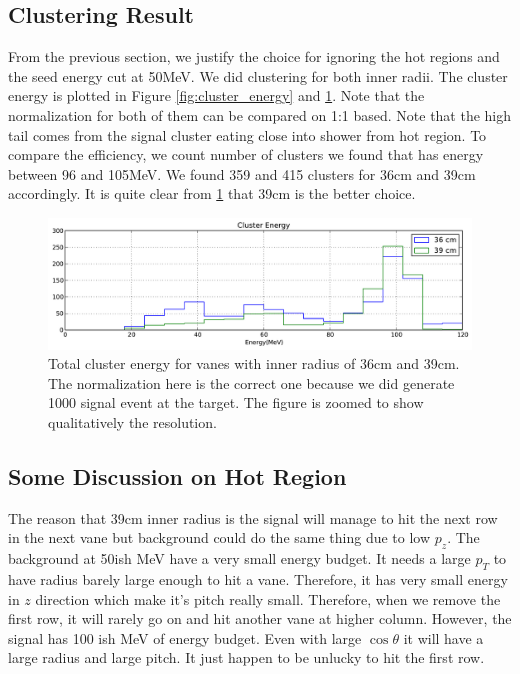 \documentclass[11pt]{article}
\begin{document}
\subsection{Clustering Result}
From the previous section, we justify the choice for ignoring the hot regions and the seed energy cut at 50MeV. We did clustering for both inner radii. The cluster energy is plotted in Figure \ref{fig:cluster_energy} and \ref{fig:cluster_energy_no_zoom}. Note that the normalization for both of them can be compared on 1:1 based. Note that the high tail comes from the signal cluster eating close into shower from hot region. To compare the efficiency, we count number of clusters we found that has energy between 96 and 105MeV. We found 359 and 415 clusters for 36cm and 39cm accordingly. It is quite clear from \ref{fig:cluster_energy_no_zoom} that 39cm is the better choice. 

\begin{figure}[htbp]
   \centering
   \includegraphics[width=\textwidth]{../plot/clusterenergy_no_zoom.pdf} %
   \caption{Total cluster energy for vanes with inner radius of 36cm and 39cm. The normalization here is the correct one because we did generate 1000 signal event at the target. The figure is zoomed to show qualitatively the resolution.}
   \label{fig:cluster_energy_no_zoom}
\end{figure}

\subsection{Some Discussion on Hot Region}

The reason that 39cm inner radius is the signal will manage to hit the next row in the next vane but background could do the same thing due to low $p_z$. The background at 50ish MeV have a very small energy budget. It needs a large $p_T$ to have radius barely large enough to hit a vane. Therefore, it has very small energy in $z$ direction which make it's pitch really small. Therefore, when we remove the first row, it will rarely go on and hit another vane at higher column. However, the signal has 100 ish MeV of energy budget. Even with large $\cos \theta$ it will have a large radius and large pitch. It just happen to be unlucky to hit the first row.
\end{document}
